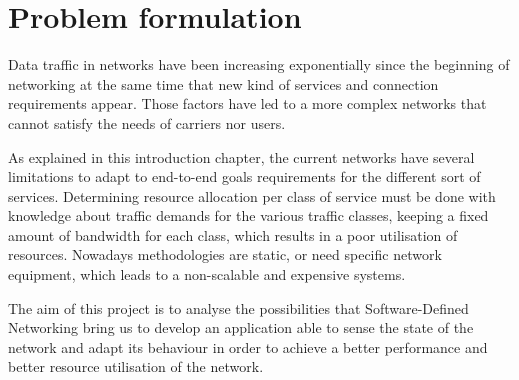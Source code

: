 \section{Problem formulation}
\label{sec:problemformulation}

Data traffic in networks have been increasing exponentially since the beginning of networking at the same time that new kind of services and connection requirements appear. Those factors have led to a more complex networks that cannot satisfy the needs of carriers nor users.

As explained in this introduction chapter, the current networks have several limitations to adapt to end-to-end goals requirements for the different sort of services. Determining resource allocation per class of service must be done with knowledge about traffic demands for the various traffic classes, keeping a fixed amount of bandwidth for each class, which results in a poor utilisation of resources. Nowadays methodologies are static, or need specific network equipment, which leads to a non-scalable and expensive systems.

The aim of this project is to analyse the possibilities that Software-Defined Networking bring us to develop an application able to sense the state of the network and adapt its behaviour in order to achieve a better performance and better resource utilisation of the network.

